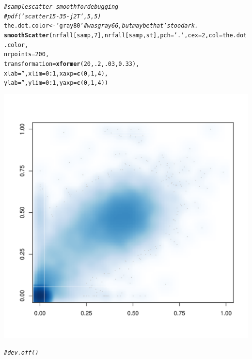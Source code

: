 \documentclass{article}\usepackage[]{graphicx}\usepackage[]{color}
\makeatletter
\def\maxwidth{ %
  \ifdim\Gin@nat@width>\linewidth
    \linewidth
  \else
    \Gin@nat@width
  \fi
}
\newcommand{\hlnum}[1]{\textcolor[rgb]{0.686,0.059,0.569}{#1}}%
\newcommand{\hlstr}[1]{\textcolor[rgb]{0.192,0.494,0.8}{#1}}%
\newcommand{\hlcom}[1]{\textcolor[rgb]{0.678,0.584,0.686}{\textit{#1}}}%
\newcommand{\hlopt}[1]{\textcolor[rgb]{0,0,0}{#1}}%
\newcommand{\hlstd}[1]{\textcolor[rgb]{0.345,0.345,0.345}{#1}}%
\newcommand{\hlkwb}[1]{\textcolor[rgb]{0.69,0.353,0.396}{#1}}%
\newcommand{\hlkwc}[1]{\textcolor[rgb]{0.333,0.667,0.333}{#1}}%
\newcommand{\hlkwd}[1]{\textcolor[rgb]{0.737,0.353,0.396}{\textbf{#1}}}%
\newenvironment{kframe}{%
 \def\at@end@of@kframe{}%
 \ifinner\ifhmode%
  \def\at@end@of@kframe{\end{minipage}}%
  \begin{minipage}{\columnwidth}%
 \fi\fi%
 \def\FrameCommand##1{\hskip\@totalleftmargin \hskip-\fboxsep
 \colorbox{shadecolor}{##1}\hskip-\fboxsep
     \hskip-\linewidth \hskip-\@totalleftmargin \hskip\columnwidth}%
 \MakeFramed {\advance\hsize-\width
   \@totalleftmargin\z@ \linewidth\hsize
   \@setminipage}}%
 {\par\unskip\endMakeFramed%
 \at@end@of@kframe}
\newenvironment{knitrout}{}{} %
\makeatother
\begin{document}
\begin{knitrout}\footnotesize
{}\color{fgcolor}\begin{kframe}
\begin{alltt}
\hlcom{# sample scatter-smooth for debugging }
\hlcom{#pdf('scatter15-35-j2T',5,5)}
\hlstd{the.dot.color} \hlkwb{<-} \hlstr{'gray80'} \hlcom{# was gray66, but maybe that's too dark.}
\hlkwd{smoothScatter}\hlstd{(nrfall[samp,}\hlnum{7}\hlstd{], nrfall[samp,st],} \hlkwc{pch}\hlstd{=}\hlstr{'.'}\hlstd{,} \hlkwc{cex}\hlstd{=}\hlnum{2}\hlstd{,} \hlkwc{col}\hlstd{=the.dot.color,}
              \hlkwc{nrpoints}\hlstd{=}\hlnum{200}\hlstd{,}
              \hlkwc{transformation}\hlstd{=}\hlkwd{xformer}\hlstd{(}\hlnum{20}\hlstd{,}\hlnum{.2}\hlstd{,}\hlnum{.03}\hlstd{,}\hlnum{0.33}\hlstd{),}
              \hlkwc{xlab}\hlstd{=}\hlstr{''}\hlstd{,} \hlkwc{xlim}\hlstd{=}\hlnum{0}\hlopt{:}\hlnum{1}\hlstd{,} \hlkwc{xaxp}\hlstd{=}\hlkwd{c}\hlstd{(}\hlnum{0}\hlstd{,}\hlnum{1}\hlstd{,}\hlnum{4}\hlstd{),}
              \hlkwc{ylab}\hlstd{=}\hlstr{''}\hlstd{,} \hlkwc{ylim}\hlstd{=}\hlnum{0}\hlopt{:}\hlnum{1}\hlstd{,} \hlkwc{yaxp}\hlstd{=}\hlkwd{c}\hlstd{(}\hlnum{0}\hlstd{,}\hlnum{1}\hlstd{,}\hlnum{4}\hlstd{))}
\end{alltt}
\end{kframe}
\includegraphics[width=\maxwidth]{Fig1-mscat-figs/unnamed-chunk-21-1} 
\begin{kframe}\begin{alltt}
\hlcom{#dev.off()}
\end{alltt}
\end{kframe}
\end{knitrout}
\end{document}
